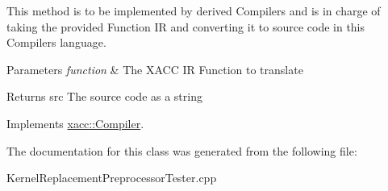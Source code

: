 This method is to be implemented by derived Compilers and is in charge of taking the provided Function IR and converting it to source code in this Compiler\textquotesingle{}s language.


\begin{DoxyParams}{Parameters}
{\em function} & The X\+A\+CC IR Function to translate \\
\hline
\end{DoxyParams}
\begin{DoxyReturn}{Returns}
src The source code as a string 
\end{DoxyReturn}


Implements \hyperlink{a01451_aeedbe58a33fed29e4d7694ae743e25e7}{xacc\+::\+Compiler}.



The documentation for this class was generated from the following file\+:\begin{DoxyCompactItemize}
\item 
Kernel\+Replacement\+Preprocessor\+Tester.\+cpp\end{DoxyCompactItemize}
